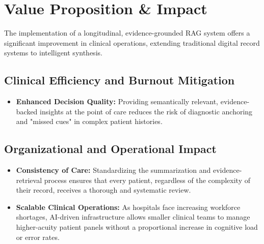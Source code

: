 \section{Value Proposition \& Impact}
\label{sec:impact}
The implementation of a longitudinal, evidence-grounded RAG system offers a significant improvement in clinical operations, extending traditional digital record systems to intelligent synthesis.

\subsection{Clinical Efficiency and Burnout Mitigation}
\begin{itemize}

    \item \textbf{Enhanced Decision Quality:} Providing semantically relevant, evidence-backed insights at the point of care reduces the risk of diagnostic anchoring and "missed cues" in complex patient histories.
\end{itemize}



\subsection{Organizational and Operational Impact}
\begin{itemize}
    \item \textbf{Consistency of Care:} Standardizing the summarization and evidence-retrieval process ensures that every patient, regardless of the complexity of their record, receives a thorough and systematic review.
    \item \textbf{Scalable Clinical Operations:} As hospitals face increasing workforce shortages, AI-driven infrastructure allows smaller clinical teams to manage higher-acuity patient panels without a proportional increase in cognitive load or error rates.
\end{itemize}
